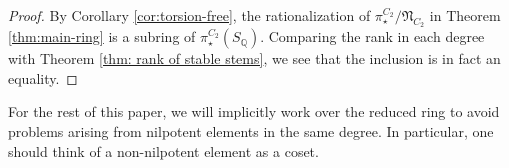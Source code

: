 \documentclass[psamsfonts]{amsart}
\newcommand{\Q}{\mathbb Q}
\newcommand{\fN}{\mathfrak N}
\theoremstyle{definition}
\theoremstyle{remark}
\newtheorem{remark}[theorem]{Remark}
\numberwithin{equation}{section}
\begin{document}
\begin{proof}
By Corollary \ref{cor:torsion-free}, the rationalization of $\pi^{C_2}_\star/\fN_{C_2}$ in Theorem \ref{thm:main-ring} is a subring of $\pi_\star^{C_2}(S_\Q)$. Comparing the rank in each degree with Theorem \ref{thm: rank of stable stems}, we see that the inclusion is in fact an equality.
\end{proof}



For the rest of this paper, we will implicitly work over the reduced ring to avoid problems arising from nilpotent elements in the same degree. In particular, one should think of a non-nilpotent element as a coset.
\end{document}
